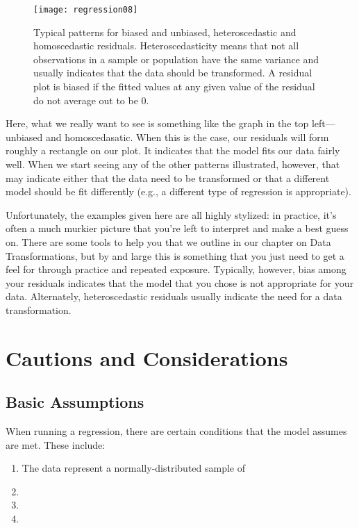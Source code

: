 \begin{figure}[htp]
\texttt{[image: regression08]}
\caption{Typical patterns for biased and unbiased, heteroscedastic and homoscedastic residuals. Heteroscedasticity means that not all observations in a sample or population have the same variance and usually indicates that the data should be transformed. A residual plot is biased if the fitted values at any given value of the residual do not average out to be 0.}
\label{fig:regression08}
\end{figure}

Here, what we really want to see is something like the graph in the top left---unbiased and homoscedasatic. When this is the case, our residuals will form roughly a rectangle on our plot. It indicates that the model fits our data fairly well. When we start seeing any of the other patterns illustrated, however, that may indicate either that the data need to be transformed or that a different model should be fit differently (e.g., a different type of regression is appropriate).

Unfortunately, the examples given here are all highly stylized: in practice, it's often a much murkier picture that you're left to interpret and make a best guess on. There are some tools to help you that we outline in our chapter on Data Transformations, but by and large this is something that you just need to get a feel for through practice and repeated exposure. Typically, however, bias among your residuals indicates that the model that you chose is not appropriate for your data. Alternately, heteroscedastic residuals usually indicate the need for a data transformation.

\section{Cautions and Considerations}

\subsection{Basic Assumptions}

When running a regression, there are certain conditions that the model assumes are met. These include:
\begin{enumerate}
	\item The data represent a normally-distributed sample of 
	\item 
	\item 
	\item 
\end{enumerate}


